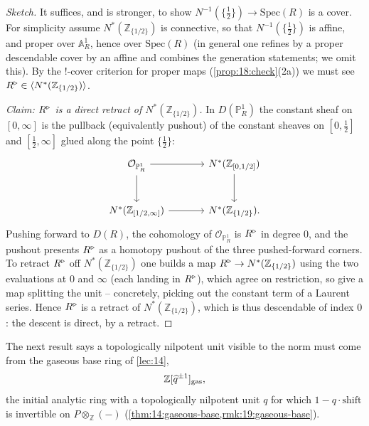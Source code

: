 \begin{proof}[Sketch]
It suffices, and is stronger, to show $N^{-1}(\{\tfrac12\})\to\mathrm{Spec}(R)$
is a cover. For simplicity assume $N^*(\mathbb Z_{\{1/2\}})$ is connective, so
that $N^{-1}(\{\tfrac12\})$ is affine, and proper over $\mathbb A^1_R$, hence over
$\mathrm{Spec}(R)$ (in general one refines by a proper descendable cover by an
affine and combines the generation statements; we omit this). By the
$!$-cover criterion for proper maps (\cref{prop:18:check}(2a)) we must see
$R^{\triangleright}\in\langle N^*(\mathbb Z_{\{1/2\}})\rangle$.

\emph{Claim: $R^{\triangleright}$ is a direct retract of $N^*(\mathbb Z_{\{1/2\}})$.} In
$D(\mathbb P^1_R)$ the constant sheaf on $[0,\infty]$ is the pullback (equivalently
pushout) of the constant sheaves on $[0,\tfrac12]$ and $[\tfrac12,\infty]$ glued
along the point $\{\tfrac12\}$:
\begin{equation*}
\begin{tikzcd}[column sep=large, row sep=large]
\mathcal O_{\mathbb P^1_R} \arrow[r] \arrow[d]
& N^*(\mathbb Z_{[0,1/2]}) \arrow[d] \\
N^*(\mathbb Z_{[1/2,\infty]}) \arrow[r] & N^*(\mathbb Z_{\{1/2\}}).
\end{tikzcd}
\end{equation*}
Pushing forward to $D(R)$, the cohomology of $\mathcal O_{\mathbb P^1_R}$ is
$R^{\triangleright}$ in degree $0$, and the pushout presents $R^{\triangleright}$ as a homotopy pushout of
the three pushed-forward corners. To retract $R^{\triangleright}$ off $N^*(\mathbb Z_{\{1/2\}})$
one builds a map $R^{\triangleright}\to N^*(\mathbb Z_{\{1/2\}})$ using the two evaluations at
$0$ and $\infty$ (each landing in $R^{\triangleright}$), which agree on restriction, so give a
map splitting the unit -- concretely, picking out the constant term of a Laurent
series. Hence $R^{\triangleright}$ is a retract of $N^*(\mathbb Z_{\{1/2\}})$, which is thus
descendable of index $0$: the descent is direct, by a retract.
\end{proof}

The next result says a topologically nilpotent unit visible to the norm must come
from the gaseous base ring of \cref{lec:14},
\begin{equation*}
\mathbb Z[\widehat q^{\pm1}]_{\mathrm{gas}},
\end{equation*}
the initial analytic ring with a topologically nilpotent unit $q$ for which
$1-q\cdot\mathrm{shift}$ is invertible on $P\otimes_{\mathbb Z}(-)$
(\cref{thm:14:gaseous-base,rmk:19:gaseous-base}).

